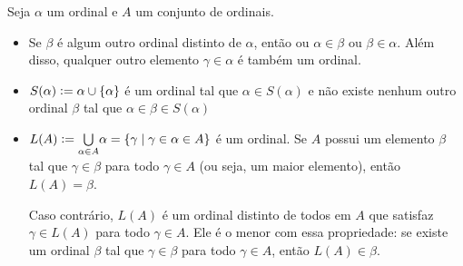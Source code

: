 \documentclass[11pt]{article}
\newcommand{\defeq}{\vcentcolon=}
\theoremstyle{definition}
\theoremstyle{definition}
\newtheorem*{theorem*}{Teorema}
\newenvironment{teorema*}{
\definecolor{shadecolor}{HTML}{f59aa3}
\begin{shaded}
\begin{theorem*}
}
{
\end{theorem*}
\end{shaded}
}
\theoremstyle{definition}
\theoremstyle{definition}
\theoremstyle{definition}
\theoremstyle{definition}
\theoremstyle{definition}
\theoremstyle{definition}
\theoremstyle{definition}
\theoremstyle{definition}
\theoremstyle{definition}
\theoremstyle{definition}
\theoremstyle{definition}
\begin{document}
\begin{teorema*}
  Seja $\alpha$ um ordinal e $A$ um conjunto de ordinais.
  \begin{itemize}[label = ]
  \item Se $\beta$ é algum outro ordinal distinto de $\alpha$, então ou $\alpha \in \beta$ ou $\beta \in \alpha$. Além disso, qualquer outro elemento $\gamma \in \alpha$ é também um ordinal.
  \item $S(\alpha) \defeq \alpha \cup \{\alpha\}$ é um ordinal tal que $\alpha \in S(\alpha)$ e não existe nenhum outro ordinal $\beta$ tal que $\alpha \in \beta \in S(\alpha)$
  \item  $L(A) \defeq \underset{\alpha \in A}{\bigcup} \alpha = \{\gamma \mid \gamma \in \alpha \in A\}$ é um ordinal. Se $A$ possui um elemento $\beta$ tal que $\gamma \in \beta$ para todo $\gamma \in A$ (ou seja, um maior elemento), então $L(A) = \beta$. 
  
  Caso contrário, $L(A)$ é um ordinal distinto de todos em $A$ que satisfaz $\gamma \in L(A)$ para todo $\gamma \in A$. Ele é o menor com essa propriedade: se existe um ordinal $\beta$ tal que $\gamma \in \beta$ para todo $\gamma \in A$, então $L(A) \in \beta$.
  \end{itemize}
\end{teorema*}
\end{document}
